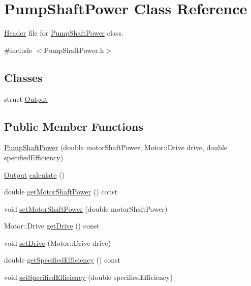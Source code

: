 \hypertarget{class_pump_shaft_power}{}\section{Pump\+Shaft\+Power Class Reference}
\label{class_pump_shaft_power}


\hyperlink{class_header}{Header} file for \hyperlink{class_pump_shaft_power}{Pump\+Shaft\+Power} class.  




{\ttfamily \#include $<$Pump\+Shaft\+Power.\+h$>$}

\subsection*{Classes}
\begin{DoxyCompactItemize}
\item 
struct \hyperlink{struct_pump_shaft_power_1_1_output}{Output}
\end{DoxyCompactItemize}
\subsection*{Public Member Functions}
\begin{DoxyCompactItemize}
\item 
\hyperlink{class_pump_shaft_power_a7eea468dbb3efe1f0e8ae77a2d16efe2}{Pump\+Shaft\+Power} (double motor\+Shaft\+Power, Motor\+::\+Drive drive, double specified\+Efficiency)
\item 
\hyperlink{struct_pump_shaft_power_1_1_output}{Output} \hyperlink{class_pump_shaft_power_a0937a4e2e68682658a33ee4ea4ce00d8}{calculate} ()
\item 
double \hyperlink{class_pump_shaft_power_acb91eadb960f946ffee5373d4839a5be}{get\+Motor\+Shaft\+Power} () const
\item 
void \hyperlink{class_pump_shaft_power_a77b8c621c7c92841dbd00112437c413b}{set\+Motor\+Shaft\+Power} (double motor\+Shaft\+Power)
\item 
Motor\+::\+Drive \hyperlink{class_pump_shaft_power_a382653196fd65562cd3823049ab7573a}{get\+Drive} () const
\item 
void \hyperlink{class_pump_shaft_power_a5cbcf0acd63ae4a2ffe9a5c13ba73a3a}{set\+Drive} (Motor\+::\+Drive drive)
\item 
double \hyperlink{class_pump_shaft_power_a93c70d2b6f70d6d98b97859fc095193a}{get\+Specified\+Efficiency} () const
\item 
void \hyperlink{class_pump_shaft_power_a7d2c64ba11fb287d9b46f7d0890ee988}{set\+Specified\+Efficiency} (double specified\+Efficiency)
\end{DoxyCompactItemize}


